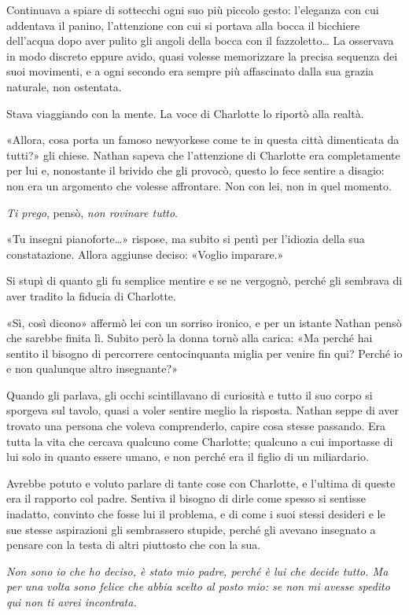 \documentclass[a4paper,oneside,11pt]{memoir}
\begin{document}
Continuava a spiare di sottecchi ogni suo più piccolo gesto: l'eleganza con cui addentava il panino, l'attenzione con
cui si portava alla bocca il bicchiere dell'acqua dopo aver pulito gli angoli della bocca con il fazzoletto\dots{} La
osservava in modo discreto eppure avido, quasi volesse memorizzare la precisa sequenza dei suoi movimenti, e a ogni
secondo era sempre più affascinato dalla sua grazia naturale, non ostentata.

Stava viaggiando con la mente. La voce di Charlotte lo riportò alla realtà.

«Allora, cosa porta un famoso newyorkese come te in questa città dimenticata da tutti?» gli chiese. Nathan sapeva che
l'attenzione di Charlotte era completamente per lui e, nonostante il brivido che gli provocò, questo lo fece sentire a
disagio: non era un argomento che volesse affrontare. Non con lei, non in quel momento.

\emph{Ti prego}, pensò, \emph{non rovinare tutto}.

«Tu insegni pianoforte\dots{}» rispose, ma subito si pentì per l'idiozia della sua constatazione. Allora aggiunse
deciso: «Voglio imparare.»

Si stupì di quanto gli fu semplice mentire e se ne vergognò, perché gli sembrava di aver tradito la fiducia di
Charlotte.

«Sì, così dicono» affermò lei con un sorriso ironico, e per un istante Nathan pensò che sarebbe finita lì. Subito
però la donna tornò alla carica: «Ma perché hai sentito il bisogno di percorrere centocinquanta miglia per venire
fin qui? Perché io e non qualunque altro insegnante?»

Quando gli parlava, gli occhi scintillavano di curiosità e tutto il suo corpo si sporgeva sul tavolo, quasi a voler
sentire meglio la risposta. Nathan seppe di aver trovato una persona che voleva comprenderlo, capire cosa stesse
passando. Era tutta la vita che cercava qualcuno come Charlotte; qualcuno a cui importasse di lui solo in quanto essere
umano, e non perché era il figlio di un miliardario.

Avrebbe potuto e voluto parlare di tante cose con Charlotte, e l'ultima di queste era il rapporto col padre. Sentiva il
bisogno di dirle come spesso si sentisse inadatto, convinto che fosse lui il problema, e di come i suoi stessi desideri
e le sue stesse aspirazioni gli sembrassero stupide, perché gli avevano insegnato a pensare con la testa di altri
piuttosto che con la sua.

\emph{Non sono io che ho deciso, è stato mio padre, perché è lui che decide tutto. Ma per una volta sono felice che
abbia scelto al posto mio: se non mi avesse spedito qui non ti avrei incontrata.}
\end{document}
